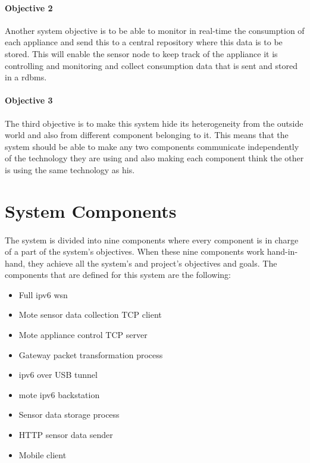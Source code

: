 \documentclass[oneside,12pt,a4paper,final]{book}
\begin{document}
\paragraph{Objective 2}
Another system objective is to be able to monitor in real-time the consumption of each appliance and send this to a central repository where this data is to be stored. This will enable the sensor node to keep track of the appliance it is controlling and monitoring and collect consumption data that is sent and stored in a \gls{rdbms}.
\paragraph{Objective 3}
The third objective is to make this system hide its heterogeneity from the outside world and also from different component belonging to it. This means that the system should be able to make any two components communicate independently of the technology they are using and also making each component think the other is using the same technology as his. 

\section{System Components}
\paragraph{}
The system is divided into nine components where every component is in charge of a part of the system's objectives. When these nine components work hand-in-hand, they achieve all the system's and project's objectives and goals. The components that are defined for this system are the following:

\begin{itemize}
\item Full \gls{ipv6} \gls{wsn}
\item Mote sensor data collection TCP client
\item Mote appliance control TCP server
\item Gateway packet transformation process
\item \gls{ipv6} over USB tunnel
\item mote \gls{ipv6} backstation
\item Sensor data storage process
\item HTTP sensor data sender
\item Mobile client
\end{itemize}
\end{document}
